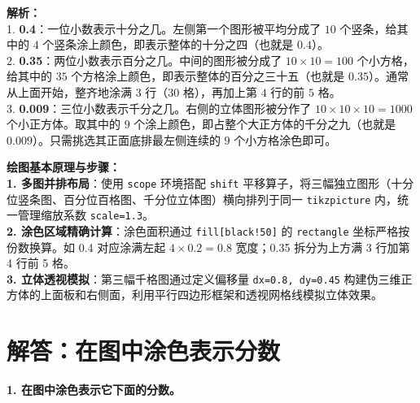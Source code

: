 \vspace{0.6cm}
{\small\color{gray}
\textbf{解析：}\\
1. \textbf{0.4}：一位小数表示十分之几。左侧第一个图形被平均分成了 $10$ 个竖条，给其中的 $4$ 个竖条涂上颜色，即表示整体的十分之四（也就是 $0.4$）。\\
2. \textbf{0.35}：两位小数表示百分之几。中间的图形被分成了 $10 \times 10 = 100$ 个小方格，给其中的 $35$ 个方格涂上颜色，即表示整体的百分之三十五（也就是 $0.35$）。通常从上面开始，整齐地涂满 $3$ 行（$30$ 格），再加上第 $4$ 行的前 $5$ 格。\\
3. \textbf{0.009}：三位小数表示千分之几。右侧的立体图形被分作了 $10 \times 10 \times 10 = 1000$ 个小正方体。取其中的 $9$ 个涂上颜色，即占整个大正方体的千分之九（也就是 $0.009$）。只需挑选其正面底排最左侧连续的 $9$ 个小方格涂色即可。
}

\vspace{0.6cm}

{\small\color{blue!70!black}
\textbf{绘图基本原理与步骤：}\\
\textbf{1. 多图并排布局}：使用 \texttt{scope} 环境搭配 \texttt{shift} 平移算子，将三幅独立图形（十分位竖条图、百分位百格图、千分位立体图）横向排列于同一 \texttt{tikzpicture} 内，统一管理缩放系数 \texttt{scale=1.3}。\\
\textbf{2. 涂色区域精确计算}：涂色面积通过 \texttt{fill[black!50]} 的 \texttt{rectangle} 坐标严格按份数换算。如 0.4 对应涂满左起 $4 \times 0.2 = 0.8$ 宽度；0.35 拆分为上方满 3 行加第 4 行前 5 格。\\
\textbf{3. 立体透视模拟}：第三幅千格图通过定义偏移量 \texttt{dx=0.8, dy=0.45} 构建伪三维正方体的上面板和右侧面，利用平行四边形框架和透视网格线模拟立体效果。
}






\newpage

\section{解答：在图中涂色表示分数}

\vspace{0.4cm}

\noindent\textbf{1. 在图中涂色表示它下面的分数。}

\vspace{0.8cm}

